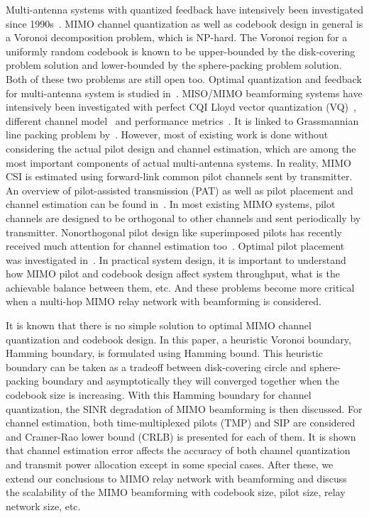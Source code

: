 \documentclass[10pt,fleqn, twocolumn]{IEEEtran}
\begin{document}
Multi-antenna systems with quantized feedback have intensively
been investigated since 1990s~\cite{Gerlach94}. MIMO channel
quantization as well as codebook design in general is a Voronoi
decomposition problem, which is NP-hard. The Voronoi region for a
uniformly random codebook is known to be upper-bounded by the
disk-covering problem solution and lower-bounded by the
sphere-packing problem solution. Both of these two problems are
still open too. Optimal quantization and feedback for
multi-antenna system is studied in~\cite{Lau04}. MISO/MIMO
beamforming systems have intensively been investigated with
perfect CQI Lloyd vector quantization (VQ)~\cite{Narula98},
different channel model~\cite{Mukka03} and performance
metrics~\cite{PXia04,Roh04}. It is linked to Grassmannian line
packing problem by~\cite{Love02}. However, most of existing work
is done without considering the actual pilot design and channel
estimation, which are among the most important components of
actual multi-antenna systems. In reality, MIMO CSI is estimated
using forward-link common pilot channels sent by transmitter. An
overview of pilot-assisted transmission (PAT) as well as pilot
placement and channel estimation can be found in~\cite{Tong04}. In
most existing MIMO systems, pilot channels are designed to be
orthogonal to other channels and sent periodically by transmitter.
Nonorthogonal pilot design like superimposed pilots has recently
received much attention for channel estimation
too~\cite{Coldrey06}. Optimal pilot placement was investigated
in~\cite{Dong02}. In practical system design, it is important to
understand how MIMO pilot and codebook design affect system
throughput, what is the achievable balance between them, etc. And
these problems become more critical when a multi-hop MIMO relay
network with beamforming is considered.

It is known that there is no simple solution to optimal MIMO
channel quantization and codebook design. In this paper, a
heuristic Voronoi boundary, Hamming boundary, is formulated using
Hamming bound. This heuristic boundary can be taken as a tradeoff
between disk-covering circle and sphere-packing boundary and
asymptotically they will converged together when the codebook size
is increasing. With this Hamming boundary for channel
quantization, the SINR degradation of MIMO beamforming is then
discussed. For channel estimation, both time-multiplexed pilots
(TMP) and SIP are considered and Cramer-Rao lower bound (CRLB) is
presented for each of them. It is shown that channel estimation
error affects the accuracy of both channel quantization and
transmit power allocation except in some special cases. After
these, we extend our conclusions to MIMO relay network with
beamforming and discuss the scalability of the MIMO beamforming
with codebook size, pilot size, relay network size, etc.
\end{document}
